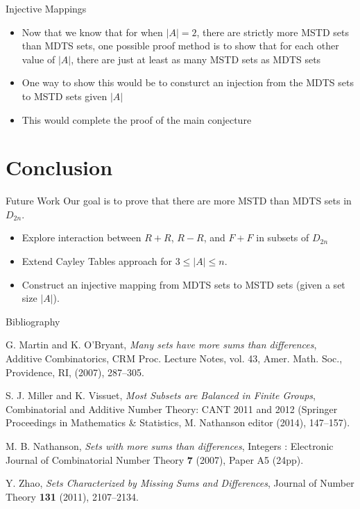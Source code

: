 \documentclass{beamer}
\newcommand{\bi}{\begin{itemize}}
\newcommand{\ei}{\end{itemize}}
\begin{document}
\begin{frame}{Injective Mappings}
\bi
	\item Now that we know that for when $|A|=2$, there are strictly more MSTD sets than MDTS sets, one possible proof method is to show that for each other value of $|A|$, there are just at least as many MSTD sets as MDTS sets
		\medskip
		\pause
	\item One way to show this would be to consturct an injection from the MDTS sets to MSTD sets given $|A|$
		\medskip
		\pause
	\item This would complete the proof of the main conjecture
\ei
\end{frame}

\section{Conclusion}


\begin{frame}{Future Work}
Our goal is to prove that there are more MSTD than MDTS sets in $D_{2n}$. 
\pause
\bi
	\item Explore interaction between $R + R$, $R - R$, and $F + F$ in subsets of $D_{2n}$
		\bigskip
		\pause
	\item Extend Cayley Tables approach for $3 \le |A| \le n$.
		\bigskip
		\pause
	\item Construct an injective mapping from MDTS sets to MSTD sets (given a set size $|A|$).
\ei
\end{frame}


\begin{frame}{Bibliography}
\begin{thebibliography}{}
		G. Martin and K. O'Bryant, \emph{Many sets have more sums than differences}, Additive Combinatorics, CRM Proc. Lecture Notes, vol. 43, Amer. Math. Soc., Providence, RI, (2007), 287--305.

	
	S. J. Miller and K. Vissuet, \emph{Most Subsets are Balanced in Finite Groups}, Combinatorial and Additive Number Theory:  CANT 2011 and 2012 (Springer Proceedings in Mathematics \& Statistics, M. Nathanson editor (2014), 147--157).
	
	
		M. B. Nathanson, \emph{Sets with more sums than differences}, Integers : Electronic Journal of Combinatorial Number Theory \textbf{7} (2007), Paper A5 (24pp).
	
		Y. Zhao, \emph{Sets Characterized by Missing Sums and Differences}, Journal of Number Theory \textbf{131} (2011), 2107--2134.
	
\end{thebibliography}
\end{frame}
\end{document}
